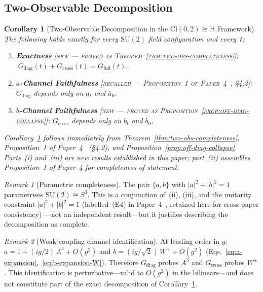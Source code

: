 \documentclass[12pt]{article}
\numberwithin{equation}{section}
\theoremstyle{plain}
\newtheorem{corollary}{Corollary}[section]
\theoremstyle{definition}
\theoremstyle{remark}
\newtheorem{remark}{Remark}[section]
\newcommand{\cl}{\mathrm{Cl}}              %
\newcommand{\su}{\mathrm{SU}}              %
\newcommand{\HH}{\mathbb{H}}               %
\newcommand{\Gdiag}{G_{\mathrm{diag}}}     %
\newcommand{\Gcross}{G_{\mathrm{cross}}}   %
\newcommand{\Gfull}{G_{\mathrm{full}}}     %
\begin{document}
	\subsection{Two-Observable Decomposition}
	\label{sec:cor-two-obs-decomp}
	
	\begin{corollary}[Two-Observable Decomposition in the
		$\cl(0,2)\cong\HH$ Framework]
		\label{cor:two-obs-decomp}
		The following holds exactly for every $\su(2)$ field configuration
		and every~$t$:
		\begin{enumerate}
			\item[(i)] \textbf{Exactness}
			\textsc{[new --- proved as
				Theorem~\ref{thm:two-obs-completeness}]}:
			$\;\Gdiag(t) + \Gcross(t) = \Gfull(t).$
			
			\item[(ii)] \textbf{$a$-Channel Faithfulness}
			\textsc{[recalled --- Proposition~1 of
				Paper~4~\cite{FirestoneP4}, \S4.2]}:
			$\Gdiag$ depends only on $a_t$ and $\bar{a}_0$.
			
			\item[(iii)] \textbf{$b$-Channel Faithfulness}
			\textsc{[new --- proved as
				Proposition~\ref{prop:off-diag-collapse}]}:
			$\Gcross$ depends only on $b_t$ and $\bar{b}_0$.
		\end{enumerate}
		Corollary~\ref{cor:two-obs-decomp} follows immediately from
		Theorem~\ref{thm:two-obs-completeness},
		Proposition~1 of Paper~4~\cite{FirestoneP4} (\S4.2), and
		Proposition~\ref{prop:off-diag-collapse}.
		Parts~(i) and~(iii) are new results established in this paper;
		part~(ii) assembles Proposition~1 of Paper~4 for completeness of
		statement.
	\end{corollary}
	
	\begin{remark}[Parametric completeness]
		\label{rem:parametric-completeness}
		The pair $\{a,b\}$ with $|a|^{2}+|b|^{2}=1$ parametrises
		$\su(2)\cong S^{3}$.  This is a conjunction of~(ii), (iii), and
		the unitarity constraint $|a|^{2}+|b|^{2}=1$
		(labelled~(E4) in Paper~4~\cite{FirestoneP4}, retained here
		for cross-paper consistency)
		---not an independent result---but it justifies describing the
		decomposition as complete.
	\end{remark}
	
	\begin{remark}[Weak-coupling channel identification]
		\label{rem:weak-coupling-id}
		At leading order in $g$:
		$a = 1 + (ig/2)\,A^{3} + O(g^{2})$ and
		$b = (ig/\sqrt{2})\,W^{+} + O(g^{2})$
		(Eqs.~\eqref{eq:a-expansion},~\eqref{eq:b-expansion-W}).
		Therefore $\Gdiag$ probes $A^{3}$ and $\Gcross$ probes $W^{\pm}$.
		This identification is perturbative---valid to $O(g^{2})$ in the
		bilinears---and does not constitute part of the exact
		decomposition of Corollary~\ref{cor:two-obs-decomp}.
	\end{remark}
	
\end{document}
